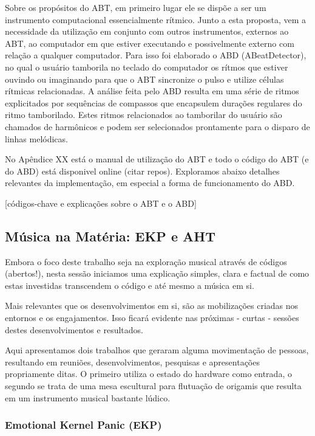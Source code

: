 Sobre os propósitos do ABT, em primeiro lugar ele se dispõe a ser um
instrumento computacional essencialmente rítmico. Junto a esta
proposta, vem a necessidade da utilização em conjunto com outros
instrumentos, externos ao ABT, ao computador em que estiver executando
e possivelmente externo com relação a qualquer computador. Para isso
foi elaborado o ABD (ABeatDetector), no qual o usuário tamborila no
teclado do computador os rítmos que estiver ouvindo ou imaginando para
que o ABT sincronize o pulso e utilize células rítmicas
relacionadas. A análise feita pelo ABD resulta em uma série de ritmos
explicitados por sequências de compassos que encapsulem durações
regulares do ritmo tamborilado. Estes ritmos relacionados ao
tamborilar do usuário são chamados de harmônicos e podem ser
selecionados prontamente para o disparo de linhas melódicas.

No Apêndice XX está o manual de utilização do ABT e todo o código do
ABT (e do ABD) está disponivel online (citar repos). Exploramos abaixo
detalhes relevantes da implementação, em especial a forma de
funcionamento do ABD.

[códigos-chave e explicações sobre o ABT e o ABD]

\subsection{Música na Matéria: EKP e AHT}
\label{aht}

Embora o foco deste trabalho seja na exploração musical através de
códigos (abertos!), nesta sessão iniciamos uma explicação simples,
clara e factual de como estas investidas transcendem o código e até
mesmo a música em si.

Mais relevantes que os desenvolvimentos em si, são as mobilizações
criadas nos entornos e os engajamentos. Isso ficará evidente nas
próximas - curtas - sessões destes desenvolvimentos e resultados.

Aqui apresentamos dois trabalhos que geraram alguma movimentação de
pessoas, resultando em reuniões, desenvolvimentos, pesquisas e
apresentações propriamente ditas. O primeiro utiliza o estado do
hardware como entrada, o segundo se trata de uma mesa escultural para
flutuação de origamis que resulta em um instrumento musical bastante
lúdico.


\subsubsection{Emotional Kernel Panic (EKP)}

